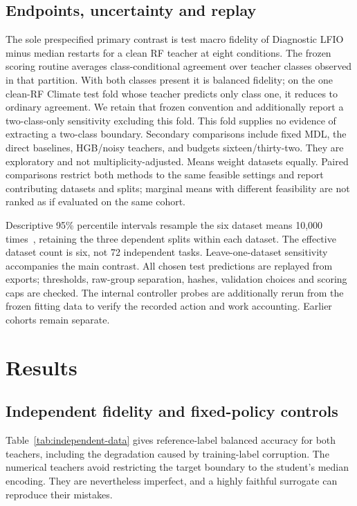 \documentclass[review,12pt]{elsarticle}
\begin{document}
\subsection{Endpoints, uncertainty and replay}
The sole prespecified primary contrast is test macro fidelity of Diagnostic LFIO minus median restarts for a clean RF teacher at eight conditions. The frozen scoring routine averages class-conditional agreement over teacher classes observed in that partition. With both classes present it is balanced fidelity; on the one clean-RF Climate test fold whose teacher predicts only class one, it reduces to ordinary agreement. We retain that frozen convention and additionally report a two-class-only sensitivity excluding this fold. This fold supplies no evidence of extracting a two-class boundary. Secondary comparisons include fixed MDL, the direct baselines, HGB/noisy teachers, and budgets sixteen/thirty-two. They are exploratory and not multiplicity-adjusted. Means weight datasets equally. Paired comparisons restrict both methods to the same feasible settings and report contributing datasets and splits; marginal means with different feasibility are not ranked as if evaluated on the same cohort.

Descriptive 95\% percentile intervals resample the six dataset means 10,000 times~\citep{efron1979}, retaining the three dependent splits within each dataset. The effective dataset count is six, not 72 independent tasks. Leave-one-dataset sensitivity accompanies the main contrast. All chosen test predictions are replayed from exports; thresholds, raw-group separation, hashes, validation choices and scoring caps are checked. The internal controller probes are additionally rerun from the frozen fitting data to verify the recorded action and work accounting. Earlier cohorts remain separate.

\section{Results}
\subsection{Independent fidelity and fixed-policy controls}\label{sec:independent-results}



Table~\ref{tab:independent-data} gives reference-label balanced accuracy for both teachers, including the degradation caused by training-label corruption. The numerical teachers avoid restricting the target boundary to the student's median encoding. They are nevertheless imperfect, and a highly faithful surrogate can reproduce their mistakes.
\end{document}
